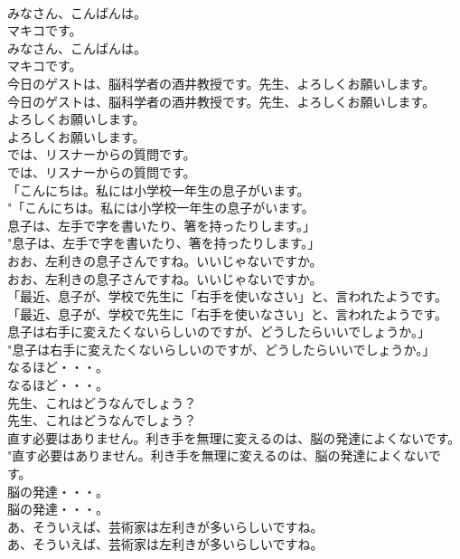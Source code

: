 \documentclass[8pt]{extreport}
\begin{document}
\begin{CJK}{UTF8}{min}
\\	みなさん、こんばんは。
\\	マキコです。	
\\	みなさん、こんばんは。
\\	マキコです。 
\\	今日のゲストは、脳科学者の酒井教授です。先生、よろしくお願いします。	
\\	今日のゲストは、脳科学者の酒井教授です。先生、よろしくお願いします。 
\\	よろしくお願いします。	
\\	よろしくお願いします。 
\\	では、リスナーからの質問です。	
\\	では、リスナーからの質問です。 
\\	「こんにちは。私には小学校一年生の息子がいます。	
\\	"「こんにちは。私には小学校一年生の息子がいます。 
\\	息子は、左手で字を書いたり、箸を持ったりします。」	
\\	"息子は、左手で字を書いたり、箸を持ったりします。」 
\\	おお、左利きの息子さんですね。いいじゃないですか。	
\\	おお、左利きの息子さんですね。いいじゃないですか。 
\\	「最近、息子が、学校で先生に「右手を使いなさい」と、言われたようです。	
\\	「最近、息子が、学校で先生に「右手を使いなさい」と、言われたようです。 
\\	息子は右手に変えたくないらしいのですが、どうしたらいいでしょうか。」	
\\	"息子は右手に変えたくないらしいのですが、どうしたらいいでしょうか。」 
\\	なるほど・・・。	
\\	なるほど・・・。 
\\	先生、これはどうなんでしょう？	
\\	先生、これはどうなんでしょう？ 
\\	直す必要はありません。利き手を無理に変えるのは、脳の発達によくないです。	
\\	"直す必要はありません。利き手を無理に変えるのは、脳の発達によくないです。 
\\	脳の発達・・・。	
\\	脳の発達・・・。 
\\	あ、そういえば、芸術家は左利きが多いらしいですね。	
\\	あ、そういえば、芸術家は左利きが多いらしいですね。 

\end{CJK}
\end{document}
